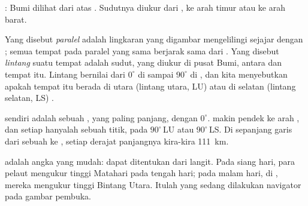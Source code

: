 \begin{omfigure}
\begin{minipage}[t]{0.48\linewidth}
{\small {}: Bumi dilihat dari atas . Sudutnya diukur dari
, ke arah timur atau ke arah barat.}
\end{minipage}
\end{omfigure}

\begin{definition}\label{def:g6:latitude-longitude:latitude}
Yang disebut \emph{paralel} adalah lingkaran yang digambar
mengelilingi  sejajar dengan ; semua tempat pada
paralel yang sama berjarak sama dari . Yang disebut
\emph{lintang} suatu tempat adalah sudut, yang diukur di pusat
Bumi, antara  dan tempat itu. Lintang bernilai dari $0^\circ$ di
 sampai $90^\circ$ di , dan kita menyebutkan apakah tempat
itu berada di utara (lintang utara, LU) atau di selatan (lintang selatan,
LS) .
\end{definition}

 sendiri adalah sebuah , yang paling panjang, dengan
 $0^\circ$.  makin pendek ke arah , dan setiap
 hanyalah sebuah titik, pada $90^\circ$\,LU atau $90^\circ$\,LS. Di
sepanjang garis dari sebuah  ke , setiap derajat 
panjangnya kira-kira \qty{111}{km}.

 adalah angka yang mudah:  dapat ditentukan dari langit. Pada
siang hari, para pelaut mengukur tinggi Matahari pada tengah hari; pada
malam hari, di , mereka mengukur tinggi Bintang Utara.
Itulah yang sedang dilakukan navigator pada gambar pembuka.

